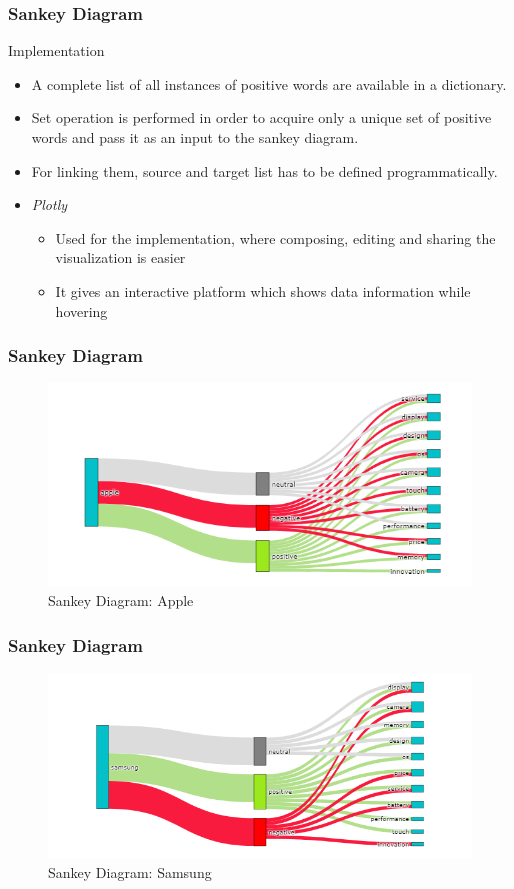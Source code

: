 \documentclass{beamer}
\begin{document}
\begin{frame}
\frametitle{Sankey Diagram}
{\Large Implementation}
\begin{itemize}
\item A complete list of all instances of positive words are available in a dictionary. 
\item  Set operation is performed in order to acquire only a unique set of positive words and pass it as an input to the sankey diagram. 
\item For linking them, source and target list has to be defined programmatically.
\item \textit{Plotly}
\begin{itemize}
\item Used for the implementation, where composing, editing and sharing the visualization is easier
\item It gives an interactive platform which shows data information while hovering
\end{itemize}
\end{itemize}
\end{frame}

\begin{frame}
\frametitle{Sankey Diagram}
\begin{figure}
\includegraphics[scale=0.5]{aplsankey}
\caption{Sankey Diagram: Apple}
\end{figure}
\end{frame}

\begin{frame}
\frametitle{Sankey Diagram}
\begin{figure}
\includegraphics[scale=0.5]{samsankey}
\caption{Sankey Diagram: Samsung}
\end{figure}
\end{frame}
\end{document}
